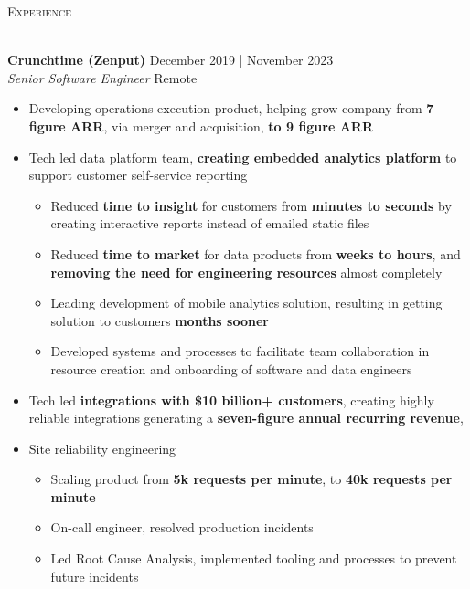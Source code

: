 \documentclass[a4paper]{article}
\newcommand{\lineunder} {
    \vspace*{-8pt} \\
    \hspace*{-18pt} {\color{Mahogany} \hrulefill} \\
}
\newcommand{\header} [1] {
    \vspace{4mm}
    {\hspace*{-18pt}\vspace*{6pt} \large \textsc{\textcolor{Mahogany}{#1}}}
    \vspace*{-6pt} \lineunder
}
\newenvironment{jobdetails}%
    {\list{}{\leftmargin=4mm}\item[]}%
    {\endlist}
\begin{document}
\pagebreak


\header{Experience}
\vspace{1mm}

\textbf{Crunchtime (Zenput)} \hfill December 2019 | November 2023 \\
\textit{Senior Software Engineer} \hfill Remote \\
\vspace{2mm}

\begin{jobdetails}
\begin{itemize} \itemsep 1pt
    \item Developing operations execution product, helping grow company from \textbf{7 figure ARR}, via merger and acquisition, \textbf{to 9 figure ARR}
    \item Tech led data platform team, \textbf{creating embedded analytics platform} to support customer self-service reporting
        \begin{itemize}
            \small
            \item Reduced \textbf{time to insight} for customers from \textbf{minutes to seconds} by creating interactive reports instead of emailed static files
            \item Reduced \textbf{time to market} for data products from \textbf{weeks to hours}, and \textbf{removing the need for engineering resources} almost completely
            \item Leading development of mobile analytics solution, resulting in getting solution to customers \textbf{months sooner} 
            \item Developed systems and processes to facilitate team collaboration in resource creation and onboarding of software and data engineers
        \end{itemize}
    \item Tech led \textbf{integrations with \$10 billion+ customers}, creating highly reliable integrations  generating a \textbf{seven-figure annual recurring revenue},
    \item Site reliability engineering
        \begin{itemize}
            \small
            \item Scaling product from \textbf{5k requests per minute}, to \textbf{40k requests per minute}
            \item On-call engineer, resolved production incidents
            \item Led Root Cause Analysis, implemented tooling and processes to prevent future incidents

\end{itemize}
\end{itemize}
\end{jobdetails}
\end{document}
